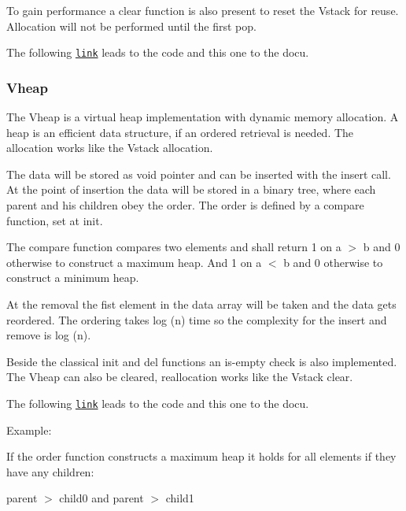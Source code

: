 To gain performance a clear function is also present to reset the {\ttfamily Vstack} for reuse. Allocation will not be performed until the first pop.

The following \href{/home/markus/Projekte/Elektra/current/src/libs/elektra/opmphm_vstack.c}{\tt link} leads to the code and this one to the docu.

\subsubsection*{Vheap}

The {\ttfamily Vheap} is a virtual heap implementation with dynamic memory allocation. A heap is an efficient data structure, if an ordered retrieval is needed. The allocation works like the {\ttfamily Vstack} allocation.

The data will be stored as void pointer and can be inserted with the insert call. At the point of insertion the data will be stored in a binary tree, where each parent and his children obey the order. The order is defined by a compare function, set at init.

The compare function compares two elements and shall return 1 on a $>$ b and 0 otherwise to construct a maximum heap. And 1 on a $<$ b and 0 otherwise to construct a minimum heap.

At the removal the fist element in the data array will be taken and the data gets reordered. The ordering takes log (n) time so the complexity for the insert and remove is log (n).

Beside the classical init and del functions an is-\/empty check is also implemented. The {\ttfamily Vheap} can also be cleared, reallocation works like the {\ttfamily Vstack} clear.

The following \href{/home/markus/Projekte/Elektra/current/src/libs/elektra/opmphm_vheap.c}{\tt link} leads to the code and this one to the docu.

Example\+:

If the order function constructs a maximum heap it holds for all elements if they have any children\+:

parent $>$ child0 and parent $>$ child1 